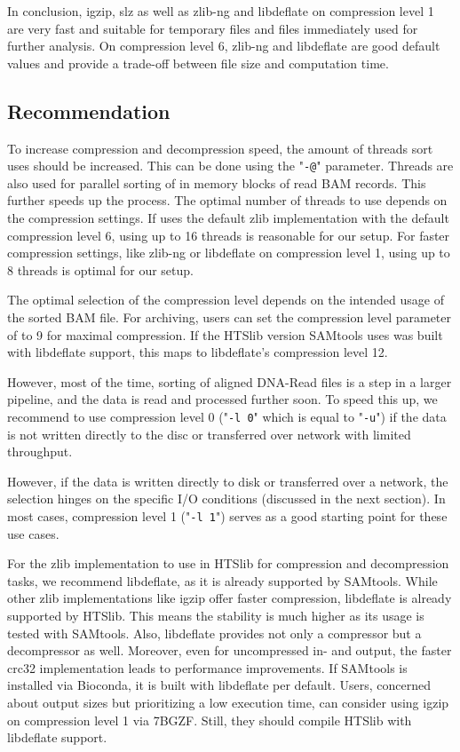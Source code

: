 In conclusion, igzip, slz as well as zlib-ng and libdeflate on compression level 1 are very fast and suitable for temporary files and files immediately used for further analysis. On compression level 6, zlib-ng and libdeflate are good default values and provide a trade-off between file size and computation time. 

\subsection{Recommendation}
To increase compression and decompression speed, the amount of threads \sort sort uses should be increased. This can be done using the "\texttt{-@}" parameter. Threads are also used for parallel sorting of in memory blocks of read BAM records. This further speeds up the process. The optimal number of threads to use depends on the compression settings. If \sort uses the default zlib implementation with the default compression level 6, using up to 16 threads is reasonable for our setup. For faster compression settings, like zlib-ng or libdeflate on compression level 1, using up to 8 threads is optimal for our setup.

The optimal selection of the compression level depends on the intended usage of the sorted BAM file.
For archiving, users can set the compression level parameter of \sort to 9 for maximal compression. If the HTSlib version SAMtools uses was built with libdeflate support, this maps to libdeflate's compression level 12. 

However, most of the time, sorting of aligned DNA-Read files is a step in a larger pipeline, and the data is read and processed further soon.
To speed this up, we recommend to use compression level 0 ("\texttt{-l 0}" which is equal to "\texttt{-u}") if the data is not written directly to the disc or transferred over network with limited throughput. 

However, if the data is written directly to disk or transferred over a network, the selection hinges on the specific I/O conditions (discussed in the next section). In most cases, compression level 1 ("\texttt{-l 1}") serves as a good starting point for these use cases.

For the zlib implementation to use in HTSlib for compression and decompression tasks, we recommend libdeflate, as it is already supported by SAMtools. While other zlib implementations like igzip offer faster compression, libdeflate is already supported by HTSlib. This means the stability is much higher as its usage is tested with SAMtools. Also, libdeflate provides not only a compressor but a decompressor as well. Moreover, even for uncompressed in- and output, the faster crc32 implementation leads to performance improvements. 
If SAMtools is installed via Bioconda, it is built with libdeflate per default. 
Users, concerned about output sizes but prioritizing a low execution time, can consider using igzip on compression level 1 via 7BGZF. Still, they should compile HTSlib with libdeflate support. 


